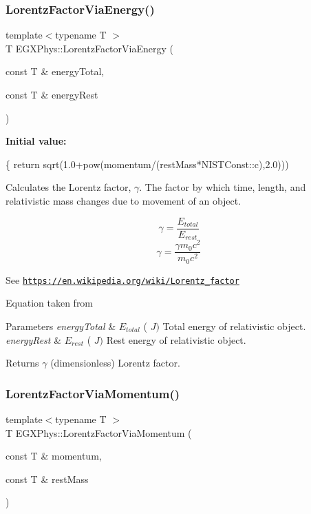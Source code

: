 \subsubsection{\texorpdfstring{Lorentz\+Factor\+Via\+Energy()}{LorentzFactorViaEnergy()}}
{\footnotesize\ttfamily template$<$typename T $>$ \\
T E\+G\+X\+Phys\+::\+Lorentz\+Factor\+Via\+Energy (\begin{DoxyParamCaption}\item[{const T \&}]{energy\+Total,  }\item[{const T \&}]{energy\+Rest }\end{DoxyParamCaption})}

{\bfseries Initial value\+:}
\begin{DoxyCode}
\{
        \textcolor{keywordflow}{return} sqrt(1.0+pow(momentum/(restMass*NISTConst::c),2.0)))
\end{DoxyCode}


Calculates the Lorentz factor, $\gamma$. The factor by which time, length, and relativistic mass changes due to movement of an object. 

\[\gamma=\frac{E_{total}}{E_{rest}}\] \[\gamma=\frac{\gamma m_0 c^2}{m_0 c^2}\]

See \href{https://en.wikipedia.org/wiki/Lorentz_factor}{\tt https\+://en.\+wikipedia.\+org/wiki/\+Lorentz\+\_\+factor}

Equation taken from


\begin{DoxyParams}{Parameters}
{\em energy\+Total} & $E_{total}$ ( $J)$ Total energy of relativistic object. \\
\hline
{\em energy\+Rest} & $E_{rest}$ ( $J)$ Rest energy of relativistic object. \\
\hline
\end{DoxyParams}
\begin{DoxyReturn}{Returns}
$\gamma$ (dimensionless) Lorentz factor. 
\end{DoxyReturn}
\mbox{\label{group___lorentz_factor_ga1ea24128654ac333dd843afdd5c003b7}} 
\subsubsection{\texorpdfstring{Lorentz\+Factor\+Via\+Momentum()}{LorentzFactorViaMomentum()}}
{\footnotesize\ttfamily template$<$typename T $>$ \\
T E\+G\+X\+Phys\+::\+Lorentz\+Factor\+Via\+Momentum (\begin{DoxyParamCaption}\item[{const T \&}]{momentum,  }\item[{const T \&}]{rest\+Mass }\end{DoxyParamCaption})}



